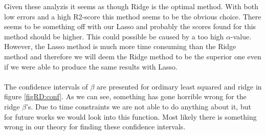 \documentclass[12pt]{article}
\begin{document}
Given these analyzis it seems as though Ridge is the optimal method. With both low errors and a high R2-score this method seems to be the obvious choice. There seems to be something off with our Lasso and probably the scores found for this method should be higher. This could possible be caused by a too high $\alpha$-value. However, the Lasso method is much more time consuming than the Ridge method and therefore we will deem the Ridge method to be the superior one even if we were able to produce the same results with Lasso. \\ \\
The confidence intervals of $\beta$ are presented for ordinary least squared and ridge in figure \ref{figRD:conf}. As we can see, something has gone horrible wrong for the ridge $\beta$'s. Due to time constraints we are not able to do anything about it, but for future works we would look into this function. Most likely there is something wrong in our theory for finding these confidence intervals.
\end{document}
